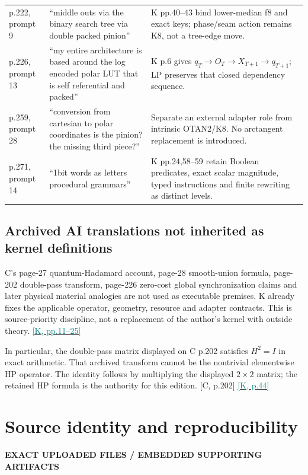 \documentclass[11pt,a4paper]{article}
\newcommand{\kref}[1]{\hyperlink{baseline.#1}{\textcolor{teal}{[K, p.#1]}}}
\newcommand{\krange}[2]{\hyperlink{baseline.#1}{\textcolor{teal}{[K, pp.#1--#2]}}}
\newcommand{\crefpage}[1]{\textcolor{muted}{[C, p.#1]}}
\newcommand{\status}[1]{{\sffamily\bfseries\scriptsize\color{teal}#1}\par}
\newcommand{\sectionstart}[1]{\par\addvspace{18pt}\Needspace{12\baselineskip}\section{#1}}
\theoremstyle{lpstyle}
\begin{document}
\begin{longtable}{L{25mm}L{67mm}L{61mm}}
p.222, prompt 9&``middle outs via the binary search tree via double packed pinion''&K pp.40--43 bind lower-median f8 and exact keys; phase/seam action remains K8, not a tree-edge move.\\
p.226, prompt 13&``my entire architecture is based around the log encoded polar LUT that is self referential and packed''&K p.6 gives $q_T\to O_T\to X_{T+1}\to q_{T+1}$; LP preserves that closed dependency sequence.\\
p.259, prompt 28&``conversion from cartesian to polar coordinates is the pinion? the missing third piece?''&Separate an external adapter role from intrinsic OTAN2/K8. No arctangent replacement is introduced.\\
p.271, prompt 14&``1bit words as letters procedural grammars''&K pp.24,58--59 retain Boolean predicates, exact scalar magnitude, typed instructions and finite rewriting as distinct levels.\\\bottomrule
\end{longtable}

\subsection{Archived AI translations not inherited as kernel definitions}
C's page-27 quantum-Hadamard account, page-28 smooth-union formula, page-202 double-pass transform, page-226 zero-cost global synchronization claims and later physical material analogies are not used as executable premises. K already fixes the applicable operator, geometry, resource and adapter contracts. This is source-priority discipline, not a replacement of the author's kernel with outside theory. \krange{11}{25}

In particular, the double-pass matrix displayed on C p.202 satisfies $H^2=I$ in exact arithmetic. That archived transform cannot be the nontrivial elementwise HP operator. The identity follows by multiplying the displayed $2\times2$ matrix; the retained HP formula is the authority for this edition. \crefpage{202} \kref{44}

\sectionstart{Source identity and reproducibility}
\status{EXACT UPLOADED FILES / EMBEDDED SUPPORTING ARTIFACTS}
\end{document}
